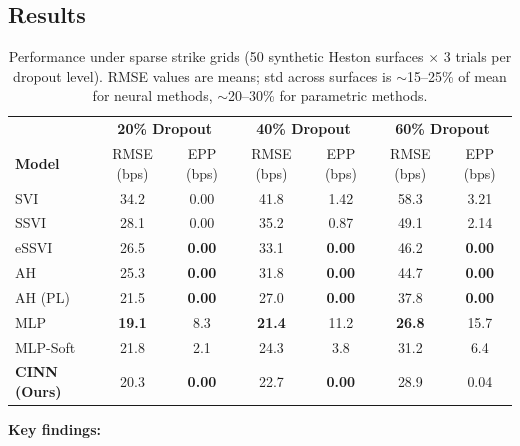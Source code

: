 \documentclass[11pt,a4paper]{article}
\begin{document}
\subsection{Results}

\begin{table}[h]
\centering
\caption{Performance under sparse strike grids (50 synthetic Heston surfaces $\times$ 3 trials per dropout level). RMSE values are means; std across surfaces is ${\sim}$15--25\% of mean for neural methods, ${\sim}$20--30\% for parametric methods.}
\label{tab:sparse}
\begin{tabular}{l|cc|cc|cc}
\toprule
& \multicolumn{2}{c|}{\textbf{20\% Dropout}} & \multicolumn{2}{c|}{\textbf{40\% Dropout}} & \multicolumn{2}{c}{\textbf{60\% Dropout}} \\
\textbf{Model} & RMSE (bps) & EPP (bps) & RMSE (bps) & EPP (bps) & RMSE (bps) & EPP (bps) \\
\midrule
SVI & 34.2 & 0.00 & 41.8 & 1.42 & 58.3 & 3.21 \\
SSVI & 28.1 & 0.00 & 35.2 & 0.87 & 49.1 & 2.14 \\
eSSVI & 26.5 & \textbf{0.00} & 33.1 & \textbf{0.00} & 46.2 & \textbf{0.00} \\
AH & 25.3 & \textbf{0.00} & 31.8 & \textbf{0.00} & 44.7 & \textbf{0.00} \\
AH (PL) & 21.5 & \textbf{0.00} & 27.0 & \textbf{0.00} & 37.8 & \textbf{0.00} \\
MLP & \textbf{19.1} & 8.3 & \textbf{21.4} & 11.2 & \textbf{26.8} & 15.7 \\
MLP-Soft & 21.8 & 2.1 & 24.3 & 3.8 & 31.2 & 6.4 \\
\textbf{CINN (Ours)} & 20.3 & \textbf{0.00} & 22.7 & \textbf{0.00} & 28.9 & 0.04 \\
\bottomrule
\end{tabular}
\end{table}

\textbf{Key findings:}
\end{document}
